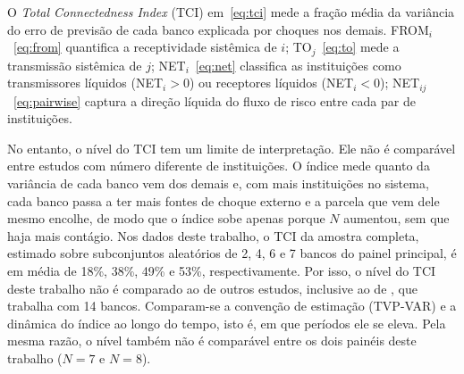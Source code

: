 \documentclass[12pt, a4paper, oneside, english, brazil]{abntex2}
\begin{document}
O \textit{Total Connectedness Index} (TCI) em~\eqref{eq:tci} mede a fração média da
variância do erro de previsão de cada banco explicada por choques nos demais.
FROM$_i$~\eqref{eq:from} quantifica a receptividade sistêmica de $i$; TO$_j$~\eqref{eq:to}
mede a transmissão sistêmica de $j$; NET$_i$~\eqref{eq:net} classifica as instituições
como transmissores líquidos (NET$_i > 0$) ou receptores líquidos (NET$_i < 0$);
NET$_{ij}$~\eqref{eq:pairwise} captura a direção líquida do fluxo de risco entre cada par
de instituições.

No entanto, o nível do TCI tem um limite de interpretação. Ele não é comparável
entre estudos com número diferente de instituições. O índice mede quanto da
variância de cada banco vem dos demais e, com mais instituições no sistema,
cada banco passa a ter mais fontes de choque externo e a parcela que vem dele
mesmo encolhe, de modo que o índice sobe apenas porque $N$ aumentou, sem que
haja mais contágio. Nos dados deste trabalho, o TCI da amostra completa,
estimado sobre subconjuntos aleatórios de 2, 4, 6 e 7 bancos do painel
principal, é em média de 18\%, 38\%, 49\% e 53\%, respectivamente.
Por isso, o nível do TCI deste trabalho não é comparado ao de outros estudos,
inclusive ao de \textcite{silva2025}, que trabalha com 14 bancos. Comparam-se
a convenção de estimação (TVP-VAR) e a dinâmica do índice ao longo do tempo,
isto é, em que períodos ele se eleva. Pela mesma
razão, o nível também não é comparável entre os dois painéis deste trabalho
($N=7$ e $N=8$).
\end{document}
